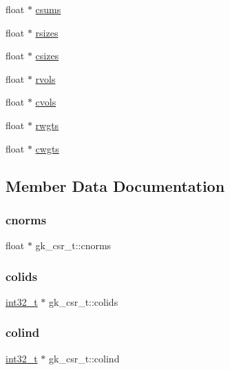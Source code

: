 \begin{DoxyCompactItemize}
\item 
float $\ast$ \hyperlink{a00634_a1b0bba1c502d83f2f693e0a239d3a349}{csums}
\item 
float $\ast$ \hyperlink{a00634_aecea9e455b69114d1fcc883c6d228fb5}{rsizes}
\item 
float $\ast$ \hyperlink{a00634_a1a3796f542789f042e03ed616a46de29}{csizes}
\item 
float $\ast$ \hyperlink{a00634_a3cfbae243c346d2461e52e6985304bbb}{rvols}
\item 
float $\ast$ \hyperlink{a00634_a3a9a8867c6f9a58169338d38befd4deb}{cvols}
\item 
float $\ast$ \hyperlink{a00634_a1cdf3e25a63376b7feb3c96834f298d6}{rwgts}
\item 
float $\ast$ \hyperlink{a00634_ac3a78774ad43e7a6c3e31e87a4f10e9a}{cwgts}
\end{DoxyCompactItemize}


\subsection{Member Data Documentation}
\mbox{\label{a00634_a7fce0eac524c7f5c889b6c44a3ee41fb}} 
\subsubsection{\texorpdfstring{cnorms}{cnorms}}
{\footnotesize\ttfamily float $\ast$ gk\+\_\+csr\+\_\+t\+::cnorms}

\mbox{\label{a00634_ad03b1a0a39247c0de8d2746b8f9b9c51}} 
\subsubsection{\texorpdfstring{colids}{colids}}
{\footnotesize\ttfamily \hyperlink{a00119_a37994e3b11c72957c6f454c6ec96d43d}{int32\+\_\+t} $\ast$ gk\+\_\+csr\+\_\+t\+::colids}

\mbox{\label{a00634_a7ec1d81e61053234c9d42fb6913d0e9f}} 
\subsubsection{\texorpdfstring{colind}{colind}}
{\footnotesize\ttfamily \hyperlink{a00119_a37994e3b11c72957c6f454c6ec96d43d}{int32\+\_\+t} $\ast$ gk\+\_\+csr\+\_\+t\+::colind}

